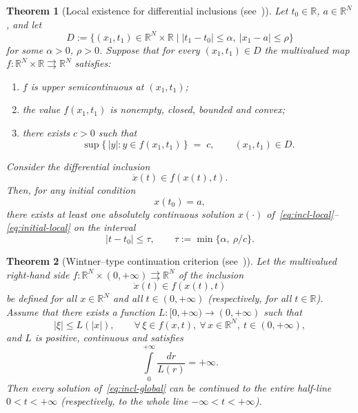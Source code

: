 \documentclass[journal]{IEEEtran}
\theoremstyle{myplain}
\newtheorem{theorem}{Theorem}
\begin{document}
\begin{theorem}[Local existence for differential inclusions (see~{\cite[Thm.~1.1]{YLG}})]
Let $t_0\in\mathbb{R}$, $a\in\mathbb{R}^N$, and let
\[
D := \bigl\{(x_1,t_1)\in\mathbb{R}^N\times\mathbb{R}
       \;\big|\; |t_1-t_0|\le \alpha,\ |x_1-a|\le\rho \bigr\}
\]
for some $\alpha>0$, $\rho>0$.
Suppose that for every $(x_1,t_1)\in D$ the multivalued map
$f:\mathbb{R}^N\times\mathbb{R}\rightrightarrows\mathbb{R}^N$
satisfies:
\begin{enumerate}
  \item $f$ is upper semicontinuous at $(x_1,t_1)$;
  \item the value $f(x_1,t_1)$ is nonempty, closed, bounded and convex;
  \item there exists $c>0$ such that
        \begin{equation}\label{eq:f-bound-local}
           \sup\{\,|y| : y\in f(x_1,t_1)\,\} \;=\; c,
           \qquad (x_1,t_1)\in D .
        \end{equation}
\end{enumerate}
Consider the differential inclusion
\begin{equation}\label{eq:incl-local}
   \dot x(t) \in f(x(t),t).
\end{equation}
Then, for any initial condition
\begin{equation}\label{eq:initial-local}
   x(t_0) = a,
\end{equation}
there exists at least one absolutely continuous solution $x(\cdot)$
of~\eqref{eq:incl-local}--\eqref{eq:initial-local}
on the interval
\[
   |t-t_0|\le\tau, \qquad
   \tau := \min\{\alpha,\ \rho/c\}.
\]
\end{theorem}

\begin{theorem}[Wintner--type continuation criterion (see~{\cite[Thm.~1.3]{YLG}})]
Let the multivalued right-hand side $f:\mathbb{R}^N\times(0,+\infty)
\rightrightarrows\mathbb{R}^N$ of the inclusion
\begin{equation}\label{eq:incl-global}
   \dot x(t) \in f(x(t),t)
\end{equation}
be defined for all $x\in\mathbb{R}^N$ and all $t\in(0,+\infty)$
(\emph{respectively,} for all $t\in\mathbb{R}$).
Assume that there exists a function $L:[0,+\infty)\to(0,+\infty)$
such that
\begin{equation}\label{eq:L-bound}
   |\xi| \le L(|x|),
   \qquad \forall\,\xi\in f(x,t),\ \forall\,x\in\mathbb{R}^N,\
          t\in(0,+\infty),
\end{equation}
and $L$ is positive, continuous and satisfies
\begin{equation}\label{eq:Wintner-integral}
   \int\limits_0^{+\infty} \frac{dr}{L(r)} = +\infty.
\end{equation}
Then every solution of~\eqref{eq:incl-global} can be continued to the
entire half-line $0<t<+\infty$
(\emph{respectively,} to the whole line $-\infty<t<+\infty$).
\end{theorem}
\end{document}
